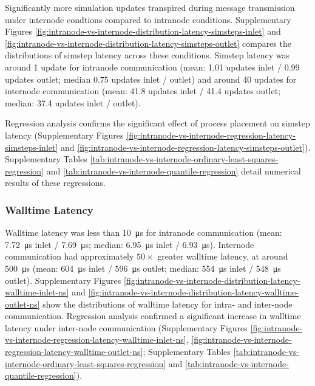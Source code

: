 Significantly more simulation updates transpired during message transmission under internode condtions compared to intranode conditions.
Supplementary Figures \ref{fig:intranode-vs-internode-distribution-latency-simsteps-inlet} and \ref{fig:intranode-vs-internode-distribution-latency-simsteps-outlet} compares the distributions of simstep latency across these conditions.
Simstep latency was around 1 update for intranode communication (mean: 1.01 updates inlet / 0.99 updates outlet; median 0.75 updates inlet / outlet) and around 40 updates for internode communication (mean: 41.8 updates inlet / 41.4 updates outlet; median: 37.4 updates inlet / outlet).

Regression analysis confirms the significant effect of process placement on simstep latency (Supplementary Figures \ref{fig:intranode-vs-internode-regression-latency-simsteps-inlet} and \ref{fig:intranode-vs-internode-regression-latency-simsteps-outlet}).
Supplementary Tables \ref{tab:intranode-vs-internode-ordinary-least-squares-regression} and \ref{tab:intranode-vs-internode-quantile-regression} detail numerical results of these regressions.

\subsubsection{Walltime Latency}

Walltime latency was less than \SI{10}{\micro\second} for intranode communication (mean: \SI{7.72}{\micro\second} inlet / \SI{7.69}{\micro\second}; median: \SI{6.95}{\micro\second} inlet / \SI{6.93}{\micro\second}).
Internode communication had approximately $50\times$ greater walltime latency, at around \SI{500}{\micro\second} (mean: \SI{604}{\micro\second} inlet / \SI{596}{\micro\second} outlet; median: \SI{554}{\micro\second} inlet / \SI{548}{\micro\second} outlet).
Supplementary Figures \ref{fig:intranode-vs-internode-distribution-latency-walltime-inlet-ns} and \ref{fig:intranode-vs-internode-distribution-latency-walltime-outlet-ns} show the distributions of walltime latency for intra- and inter-node communication.
Regression analysis confirmed a significant increase in walltime latency under inter-node communication (Supplementary Figures \ref{fig:intranode-vs-internode-regression-latency-walltime-inlet-ns}, \ref{fig:intranode-vs-internode-regression-latency-walltime-outlet-ns}; Supplementary Tables \ref{tab:intranode-vs-internode-ordinary-least-squares-regression} and \ref{tab:intranode-vs-internode-quantile-regression}).

